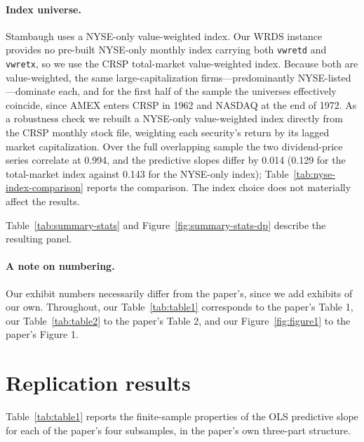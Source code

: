 \documentclass[11pt]{article}
\begin{document}
\paragraph{Index universe.} Stambaugh uses a NYSE-only value-weighted index.
Our WRDS instance provides no pre-built NYSE-only monthly index carrying both
\texttt{vwretd} and \texttt{vwretx}, so we use the CRSP total-market
value-weighted index. Because both are value-weighted, the same
large-capitalization firms---predominantly NYSE-listed---dominate each, and for
the first half of the sample the universes effectively coincide, since AMEX
enters CRSP in 1962 and NASDAQ at the end of 1972. As a robustness check we rebuilt 
a NYSE-only value-weighted index directly from the CRSP monthly stock file, 
weighting each security's return by its lagged market capitalization.
Over the full overlapping sample the two dividend-price
series correlate at 0.994, and the predictive slopes differ by 0.014
(0.129 for the total-market index against 0.143 for the NYSE-only index);
Table~\ref{tab:nyse-index-comparison} reports the comparison. The index choice
does not materially affect the results.

Table~\ref{tab:summary-stats} and Figure~\ref{fig:summary-stats-dp} describe the
resulting panel.





\paragraph{A note on numbering.} Our exhibit numbers necessarily differ from
the paper's, since we add exhibits of our own. Throughout, our
Table~\ref{tab:table1} corresponds to the paper's Table 1, our
Table~\ref{tab:table2} to the paper's Table 2, and our
Figure~\ref{fig:figure1} to the paper's Figure 1.

\section{Replication results}

Table~\ref{tab:table1} reports the finite-sample properties of the OLS
predictive slope for each of the paper's four subsamples, in the paper's own
three-part structure.


\end{document}

